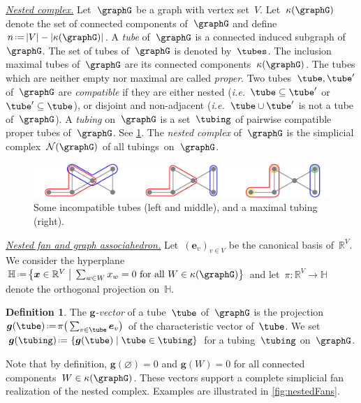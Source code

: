 \documentclass{amsart}
\theoremstyle{definition}
\newtheorem{definition}[theorem]{Definition}
\newcommand{\R}{\mathbb{R}} %
\newcommand{\HH}{\mathbb{H}} %
\renewcommand{\b}[1]{{\boldsymbol{#1}}} %
\newcommand{\set}[2]{\left\{ #1 \;\middle|\; #2 \right\}} %
\newcommand{\bigset}[2]{\big\{ #1 \;\big|\; #2 \big\}} %
\newcommand{\eqdef}{\mbox{\,\raisebox{0.2ex}{\scriptsize\ensuremath{\mathrm:}}\ensuremath{=}\,}} %
\newcommand{\ie}{\textit{i.e.}~} %
\newcommand{\darkblue}{\color{darkblue}} %
\newcommand{\defn}[1]{\textsl{\darkblue #1}} %
\newcommand{\para}[1]{\medskip\noindent\uline{\textit{#1.}}} %
\newcommand{\gvector}[1]{\b{g}(#1)} %
\newcommand{\gvectors}[1]{\b{g}(#1)} %
\newcommand{\ground}{V} %
\newcommand{\connectedComponents}{\kappa} %
\newcommand{\nestedComplex}{\mathcal{N}} %
\begin{document}
\para{Nested complex}
%
Let~$\graphG$ be a graph with vertex set~$\ground$.
Let~$\connectedComponents(\graphG)$ denote the set of connected components of~$\graphG$ and define~$n \eqdef |\ground|-|\connectedComponents(\graphG)|$.
A \defn{tube} of~$\graphG$ is a connected induced subgraph of~$\graphG$.
The set of tubes of~$\graphG$ is denoted by~$\tubes$.
The inclusion maximal tubes of~$\graphG$ are its connected components~$\connectedComponents(\graphG)$.
The tubes which are neither empty nor maximal are called \defn{proper}.
Two tubes~$\tube, \tube'$ of~$\graphG$ are \defn{compatible} if they are either nested (\ie $\tube \subseteq \tube'$ or~$\tube' \subseteq \tube$), or disjoint and non-adjacent (\ie $\tube \cup \tube'$ is not a tube of~$\graphG$).
A \defn{tubing} on~$\graphG$ is a set~$\tubing$ of pairwise compatible proper tubes of~$\graphG$.
See \cref{fig:exmNested}.
The \defn{nested complex} of~$\graphG$ is the simplicial complex~$\nestedComplex(\graphG)$ of all tubings~on~$\graphG$.

\begin{figure}[h]
	\capstart
	\centerline{\includegraphics[width=\textwidth]{exmNested}}
	\caption{Some incompatible tubes (left and middle), and a maximal tubing (right).}
	\label{fig:exmNested}
\end{figure}

\para{Nested fan and graph associahedron}
%
Let~$(\b{e}_v)_{v \in \ground}$ be the canonical basis of~$\R^\ground$.
We consider the hyperplane~${\HH \eqdef \bigset{\b{x} \in \R^\ground}{\sum_{w \in W} x_w = 0 \text{ for all } W \in \connectedComponents(\graphG)}}$ and let~$\pi : \R^\ground \to \HH$ denote the orthogonal projection on~$\HH$.

\begin{definition}
The \defn{$\b{g}$-vector} of a tube~$\tube$ of~$\graphG$ is the projection~$\gvector{\tube} \eqdef \pi \big( \sum_{v \in \tube} \b{e}_v \big)$ of the characteristic vector of~$\tube$.
We set~$\gvectors{\tubing} \eqdef \set{\gvector{\tube}}{\tube \in \tubing}$ for a tubing~$\tubing$ on~$\graphG$.
\end{definition}

Note that by definition, $\gvector{\varnothing} = 0$ and $\gvector{W} = 0$ for all connected components~$W \in \connectedComponents(\graphG)$.
These vectors support a complete simplicial fan realization of the nested complex.
Examples are illustrated in \cref{fig:nestedFans}.
\end{document}
